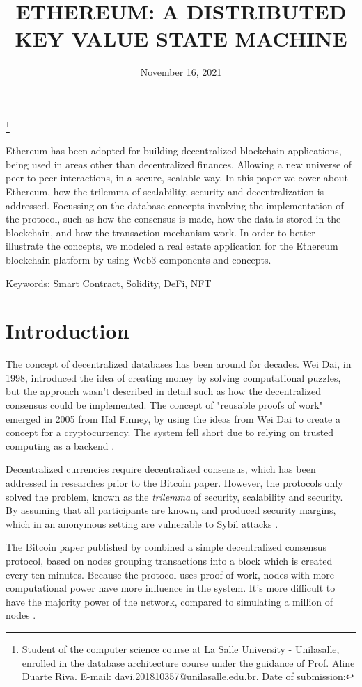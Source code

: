 \documentclass[
    article, 
    12pt,				%
	oneside,			%
	a4paper,			%
	chapter=TITLE,		%
	section=TITLE,		%
	english,			%
	english,				%
	sumario=tradicional
]{abntex2}
\date{November 16, 2021}
\title{ \textbf{\uppercase{Ethereum: a distributed key value state machine}}}
\makeatletter
\renewcommand{\imprimirautor}{
  \begin{flushright}
   \theauthor
   \footnote{Student of the computer science course at La Salle University - Unilasalle, enrolled in the database architecture course under the guidance of Prof. Aline Duarte Riva. E-mail: davi.201810357@unilasalle.edu.br. Date of submission: \thedate }
  \end{flushright}
}
\makeatother
\begin{document}
 


\thetitle

\imprimirautor


\begin{resumo}
 Ethereum has been adopted for building decentralized blockchain applications, being used in areas other than decentralized finances.
 Allowing a new universe of peer to peer interactions, in a secure, scalable way.
 In this paper we cover about Ethereum, how the trilemma of scalability, security and decentralization is addressed.
 Focussing on the database concepts involving the implementation of the protocol, such as how the consensus is made, how the data is stored in the blockchain, and how the transaction mechanism work.
 In order to better illustrate the concepts, we modeled a real estate application for the Ethereum blockchain platform by using Web3 components and concepts.
 
 \vspace{\onelineskip}
 Keywords: Smart Contract, Solidity, DeFi, NFT
\end{resumo}


\section{Introduction}

The concept of decentralized databases has been around for decades.
Wei Dai, in 1998, introduced the idea of creating money by solving computational puzzles, but the approach wasn't described in detail such as how the decentralized consensus could be implemented.
The concept of "reusable proofs of work" emerged in 2005 from Hal Finney, by using the ideas from Wei Dai to create a concept for a cryptocurrency. 
The system fell short due to relying on trusted computing as a backend \cite{buterin_eth_whitepaper_2013}.

Decentralized currencies require decentralized consensus, which has been addressed in researches prior to the Bitcoin paper.
However, the protocols only solved the problem, known as the \textit{trilemma} of security, scalability and security.
By assuming that all participants are known, and produced security margins, which in an anonymous setting are vulnerable to Sybil attacks \cite{buterin_eth_whitepaper_2013}.

The Bitcoin paper published by \citeauthor{nakamoto_bitcoin_2008} combined a simple decentralized consensus protocol, based on nodes grouping transactions into a block which is created every ten minutes.
Because the protocol uses proof of work, nodes with more computational power have more influence in the system.
It's more difficult to have the majority power of the network, compared to simulating a million of nodes \cite{buterin_eth_whitepaper_2013}.
\end{document}
